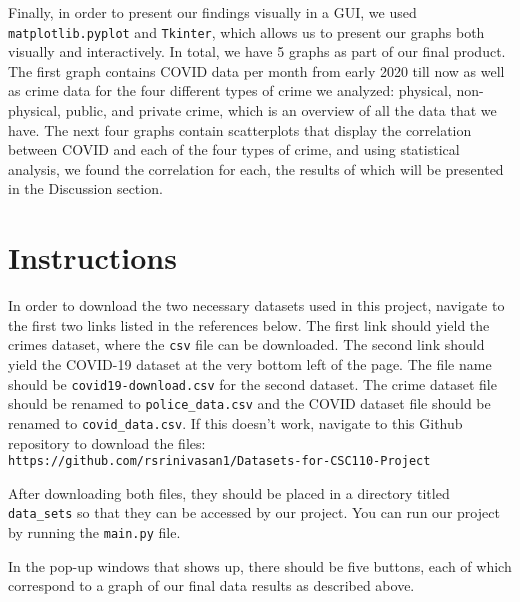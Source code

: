 \documentclass[fontsize=11pt]{article}
\begin{document}
Finally, in order to present our findings visually in a GUI, we used \verb+matplotlib.pyplot+ and \verb+Tkinter+, which allows us to present our graphs both visually and interactively. In total, we have 5 graphs as part of our final product. The first graph contains COVID data per month from early 2020 till now as well as crime data for the four different types of crime we analyzed: physical, non-physical, public, and private crime, which is an overview of all the data that we have. The next four graphs contain scatterplots that display the correlation between COVID and each of the four types of crime, and using statistical analysis, we found the correlation for each, the results of which will be presented in the Discussion section.

\section{Instructions}

In order to download the two necessary datasets used in this project, navigate to the first two links listed in the references below. The first link should yield the crimes dataset, where the \verb+csv+ file can be downloaded. The second link should yield the COVID-19 dataset at the very bottom left of the page. The file name should be \verb+covid19-download.csv+ for the second dataset. The crime dataset file should be renamed to \verb+police_data.csv+ and the COVID dataset file should be renamed to \verb+covid_data.csv+. If this doesn’t work, navigate to this Github repository to download the files:\\ \verb+https://github.com/rsrinivasan1/Datasets-for-CSC110-Project+

After downloading both files, they should be placed in a directory titled \verb+data_sets+ so that they can be accessed by our project. You can run our project by running the \verb+main.py+ file.

In the pop-up windows that shows up, there should be five buttons, each of which correspond to a graph of our final data results as described above.
\end{document}
